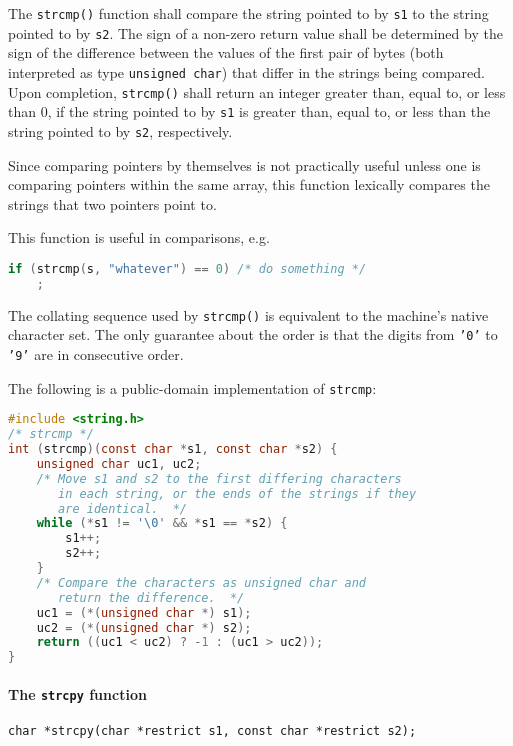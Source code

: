The \texttt{strcmp()} function shall compare the string pointed to by
\texttt{s1} to the string pointed to by \texttt{s2}. The sign of a non-zero
return value shall be determined by the sign of the difference between the
values of the first pair of bytes (both interpreted as type \texttt{unsigned
char}) that differ in the strings being compared. Upon completion,
\texttt{strcmp()} shall return an integer greater than, equal to, or less than
0, if the string pointed to by \texttt{s1} is greater than, equal to, or less
than the string pointed to by \texttt{s2}, respectively.

Since comparing pointers by themselves is not practically useful unless one is
comparing pointers within the same array, this function lexically compares the
strings that two pointers point to.

This function is useful in comparisons, e.g.
\lstset{basicstyle=\scriptsize, numbers=left, captionpos=b, tabsize=4}
\begin{lstlisting}[caption=Section \thesection listing \arabic{stringcnt},language={C},
breaklines=true,xleftmargin=15pt,label=lst:section\thesection listing\arabic{stringcnt}]
if (strcmp(s, "whatever") == 0) /* do something */
    ;
\end{lstlisting}

The collating sequence used by \texttt{strcmp()} is equivalent to the machine's
native character set. The only guarantee about the order is that the digits
from \texttt{'0'} to \texttt{'9'} are in consecutive order.

The following is a public-domain implementation of \texttt{strcmp}:
\lstset{basicstyle=\scriptsize, numbers=left, captionpos=b, tabsize=4}
\begin{lstlisting}[caption=Section \thesection listing \arabic{stringcnt},language={C},
breaklines=true,xleftmargin=15pt,label=lst:section\thesection listing\arabic{stringcnt}]
#include <string.h>
/* strcmp */
int (strcmp)(const char *s1, const char *s2) {
	unsigned char uc1, uc2;
	/* Move s1 and s2 to the first differing characters 
	   in each string, or the ends of the strings if they
	   are identical.  */
	while (*s1 != '\0' && *s1 == *s2) {
		s1++;
		s2++;
	}
	/* Compare the characters as unsigned char and
	   return the difference.  */
	uc1 = (*(unsigned char *) s1);
	uc2 = (*(unsigned char *) s2);
	return ((uc1 < uc2) ? -1 : (uc1 > uc2));
}
\end{lstlisting}

\paragraph{The \texttt{strcpy} function}
\texttt{char *strcpy(char *restrict s1, const char *restrict s2);}

